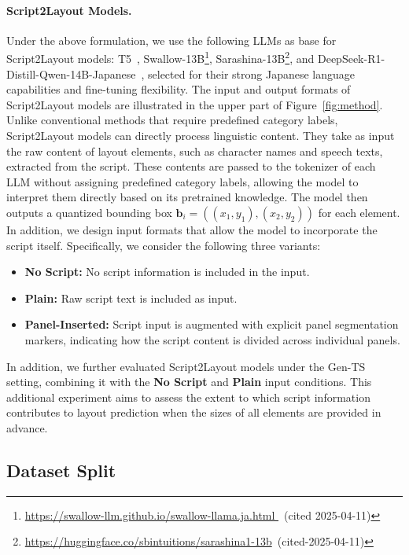 \documentclass[sigconf, screen, review, anonymous]{acmart}
\begin{document}
\paragraph{Script2Layout Models.}
Under the above formulation, we use the following LLMs as base for Script2Layout models: T5~\cite{raffel2020exploring_t5}, Swallow-13B\footnote{\url{https://swallow-llm.github.io/swallow-llama.ja.html }~(cited 2025-04-11)}, Sarashina-13B\footnote{\url{https://huggingface.co/sbintuitions/sarashina1-13b}~(cited-2025-04-11)}, and DeepSeek-R1-Distill-Qwen-14B-Japanese~\cite{deepseek-ai_deepseek-r1_2025}, selected for their strong Japanese language capabilities and fine-tuning flexibility. The input and output formats of Script2Layout models are illustrated in the upper part of Figure~\ref{fig:method}. Unlike conventional methods that require predefined category labels, Script2Layout models can directly process linguistic content. They take as input the raw content of layout elements, such as character names and speech texts, extracted from the script. These contents are passed to the tokenizer of each LLM without assigning predefined category labels, allowing the model to interpret them directly based on its pretrained knowledge. The model then outputs a quantized bounding box $\mathbf{b}_i = ((x_1, y_1), (x_2, y_2))$ for each element. In addition, we design input formats that allow the model to incorporate the script itself. Specifically, we consider the following three variants:
\begin{itemize}
  \item \textbf{No Script:} No script information is included in the input.
  \item \textbf{Plain:} Raw script text is included as input.
  \item \textbf{Panel-Inserted:} Script input is augmented with explicit panel segmentation markers, indicating how the script content is divided across individual panels.
\end{itemize}
In addition, we further evaluated Script2Layout models under the Gen-TS setting, combining it with the \textbf{No Script} and \textbf{Plain} input conditions. This additional experiment aims to assess the extent to which script information contributes to layout prediction when the sizes of all elements are provided in advance.

\subsection{Dataset Split}
\end{document}
